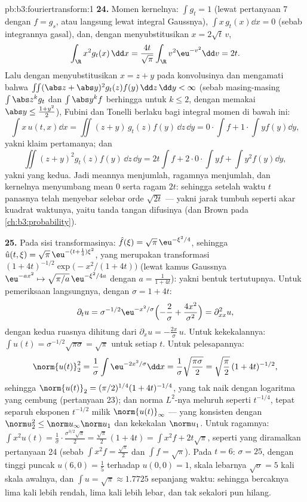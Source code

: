 \begin{solution}{pb:b3:fouriertransform:1}
\textbf{24.} Momen kernelnya: $\int g_t = 1$ (lewat pertanyaan
7 dengan $f = g_s$, atau langsung lewat integral Gaussnya), $\int
x\,g_t(x)\dd x = 0$ (sebab integrannya gasal), dan, dengan menyubstitusikan $x =
2\sqrt t\,v$,
\[
\int_\R x^2g_t(x)\,\dd x
= \frac{4t}{\sqrt\pi}\int_\R v^2\eu^{-v^2}\dd v = 2t .
\]
Lalu dengan menyubstitusikan $x = z + y$ pada konvolusinya dan mengamati bahwa
$\iint(\abs z + \abs y)^2g_t(z)f(y)\,\dd z\,\dd y < \infty$
(sebab masing-masing $\int\abs z^kg_t$ dan $\int\abs y^kf$ berhingga untuk $k
\leq 2$, dengan memakai $\abs y \leq \frac{1 + y^2}2$), Fubini dan
Tonelli berlaku bagi integral momen di bawah ini:
\[
\int x\,u(t,x)\dd x = \iint (z + y)\,g_t(z)f(y)\,\dd z\,\dd
y = 0\cdot\!\int\! f + 1\cdot\!\int\! yf(y)\dd y,
\]
yakni klaim pertamanya; dan
\[
\iint (z+y)^2g_t(z)f(y)\,\dd z\,\dd y
= 2t\int f + 2\cdot0\cdot\!\int\! yf + \int y^2f(y)\dd y ,
\]
yakni yang kedua. Jadi meannya menjumlah, ragamnya menjumlah, dan kernelnya
menyumbang mean $0$ serta ragam $2t$: sehingga setelah waktu $t$
panasnya telah menyebar selebar orde $\sqrt{2t}$ ---
yakni jarak tumbuh seperti akar kuadrat waktunya, yaitu tanda tangan
difusinya (dan  Brown pada
\cref{ch:b3:probability}).

\textbf{25.} Pada sisi transformasinya: $\hat f(\xi) =
\sqrt\pi\,\eu^{-\xi^2/4}$, sehingga $\hat u(t,\xi) =
\sqrt\pi\,\eu^{-(t + \frac14)\xi^2}$, yang merupakan transformasi
$(1 + 4t)^{-1/2}\exp\bigl(-x^2/(1+4t)\bigr)$ (lewat
kamus Gaussnya $\eu^{-ax^2} \mapsto
\sqrt{\pi/a}\,\eu^{-\xi^2/4a}$ dengan $a = \frac1{1+4t}$):
yakni bentuk tertutupnya. Untuk pemeriksaan langsungnya, dengan $\sigma = 1 + 4t$:
\[
\partial_tu = \sigma^{-1/2}\eu^{-x^2/\sigma}
\Bigl(-\frac2\sigma + \frac{4x^2}{\sigma^2}\Bigr)
= \partial^2_{xx}u ,
\]
dengan kedua ruasnya dihitung dari $\partial_xu =
-\frac{2x}\sigma\,u$. Untuk kekekalannya: $\int u(t) =
\sigma^{-1/2}\sqrt{\pi\sigma} = \sqrt\pi$ untuk setiap $t$.
Untuk pelesapannya:
\[
\norm{u(t)}_2^2 = \frac1\sigma\int\eu^{-2x^2/\sigma}\dd x
= \frac1\sigma\sqrt{\frac{\pi\sigma}2}
= \sqrt{\frac\pi2}\,(1+4t)^{-1/2},
\]
sehingga $\norm{u(t)}_2 = (\pi/2)^{1/4}(1+4t)^{-1/4}$,
yang tak naik dengan logaritma yang cembung (pertanyaan 23); dan
norma $L^2$-nya meluruh seperti $t^{-1/4}$, tepat separuh
eksponen $t^{-1/2}$ milik $\norm{u(t)}_\infty$ --- yang konsisten
dengan $\norm u_2^2 \leq \norm u_\infty\norm u_1$ dan
kekekalan $\norm u_1$. Untuk ragamnya: $\int x^2u(t) =
\frac1\sigma\cdot\frac{\sigma^{3/2}\sqrt\pi}2 =
\frac{\sqrt\pi}2\,(1 + 4t) = \int x^2f + 2t\sqrt\pi$, seperti yang
diramalkan pertanyaan 24 (sebab $\int x^2f = \frac{\sqrt\pi}2$ dan $\int
f = \sqrt\pi$). Pada $t = 6$: $\sigma = 25$, dengan tinggi puncak
$u(6, 0) = \frac15$ terhadap $u(0,0) = 1$, skala lebarnya
$\sqrt\sigma = 5$ kali skala awalnya, dan $\int u =
\sqrt\pi \approx 1.7725$ sepanjang waktu: sehingga bercaknya lima kali
lebih rendah, lima kali lebih lebar, dan tak sekalori pun hilang.

\end{solution}
